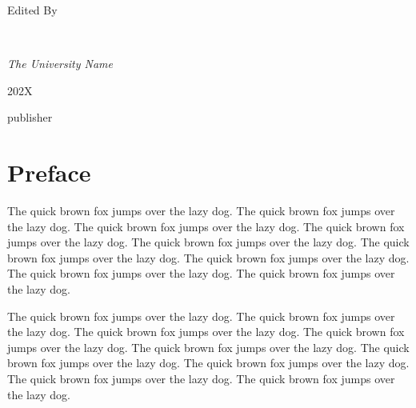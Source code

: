 \documentclass[openany,twoside,12pt]{book}
\theoremstyle{plain}
\numberwithin{equation}{chapter}
\numberwithin{figure}{chapter}
\numberwithin{table}{chapter}
\newcommand{\plogo}{\fbox{$\mathcal{PL}$}} %
\begin{document}
\begin{titlepage}
	
	Edited By
	
	\vspace{0.5\baselineskip} %
	
	{\scshape\Large \@author \\} %
	
	\vspace{0.5\baselineskip} %
	
	\textit{The University Name} %
	
	\vfill %
	
    \makeatletter

	
	\plogo %
	
	\vspace{0.3\baselineskip} %
	
	202X %

	{\large publisher} %

\end{titlepage}



\thispagestyle{empty}

\frontmatter


\chapter{Preface}

The quick brown fox jumps over the lazy dog. The quick brown fox jumps over the lazy dog. The quick brown fox jumps over the lazy dog. The quick brown fox jumps over the lazy dog. The quick brown fox jumps over the lazy dog. The quick brown fox jumps over the lazy dog. The quick brown fox jumps over the lazy dog. The quick brown fox jumps over the lazy dog. The quick brown fox jumps over the lazy dog.


The quick brown fox jumps over the lazy dog. The quick brown fox jumps over the lazy dog. The quick brown fox jumps over the lazy dog. The quick brown fox jumps over the lazy dog. The quick brown fox jumps over the lazy dog. The quick brown fox jumps over the lazy dog. The quick brown fox jumps over the lazy dog. The quick brown fox jumps over the lazy dog. The quick brown fox jumps over the lazy dog.
\end{document}
